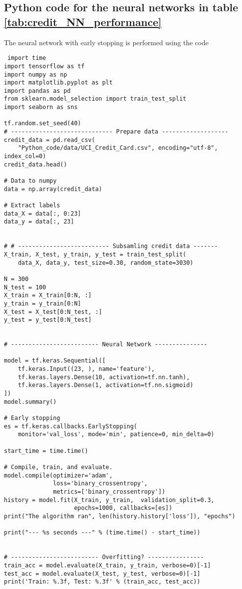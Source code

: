 \begin{appendices}
\section{Python code for the neural networks in table \ref{tab:credit_NN_performance}} \label{app:Credit_NN}
The neural network with early stopping is performed using the code
\begin{lstlisting}
 import time
import tensorflow as tf
import numpy as np
import matplotlib.pyplot as plt
import pandas as pd
from sklearn.model_selection import train_test_split
import seaborn as sns

tf.random.set_seed(40)
# ----------------------------- Prepare data -------------------
credit_data = pd.read_csv(
    "Python_code/data/UCI_Credit_Card.csv", encoding="utf-8", index_col=0)
credit_data.head()

# Data to numpy
data = np.array(credit_data)

# Extract labels
data_X = data[:, 0:23]
data_y = data[:, 23]


# # -------------------------- Subsamling credit data -------
X_train, X_test, y_train, y_test = train_test_split(
    data_X, data_y, test_size=0.30, random_state=3030)

N = 300
N_test = 100
X_train = X_train[0:N, :]
y_train = y_train[0:N]
X_test = X_test[0:N_test, :]
y_test = y_test[0:N_test]


# ------------------------- Neural Network ---------------

model = tf.keras.Sequential([
    tf.keras.Input((23, ), name='feature'),
    tf.keras.layers.Dense(10, activation=tf.nn.tanh),
    tf.keras.layers.Dense(1, activation=tf.nn.sigmoid)
])
model.summary()

# Early stopping
es = tf.keras.callbacks.EarlyStopping(
    monitor='val_loss', mode='min', patience=0, min_delta=0)

start_time = time.time()

# Compile, train, and evaluate.
model.compile(optimizer='adam',
              loss='binary_crossentropy',
              metrics=['binary_crossentropy'])
history = model.fit(X_train, y_train,  validation_split=0.3,
                    epochs=1000, callbacks=[es])
print("The algorithm ran", len(history.history['loss']), "epochs")

print("--- %s seconds ---" % (time.time() - start_time))


# ------------------------- Overfitting? ----------------
train_acc = model.evaluate(X_train, y_train, verbose=0)[-1]
test_acc = model.evaluate(X_test, y_test, verbose=0)[-1]
print('Train: %.3f, Test: %.3f' % (train_acc, test_acc))


\end{lstlisting}
\end{appendices}

